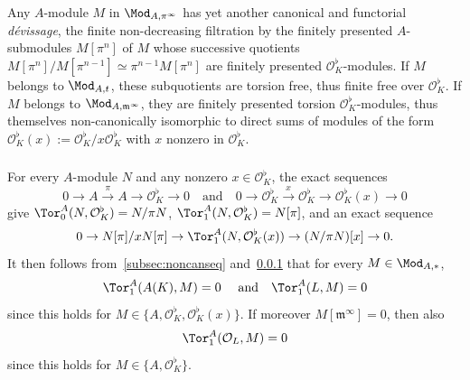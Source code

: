\subsubsection{}\label{subsec:FiltOnModAt=000026ModAm}

Any $A$-module $M$ in $\Mod_{A,\pi^{\infty}}$ has yet another canonical and functorial \emph{d\'evissage}, the finite non-decreasing filtration by the finitely presented $A$-submodules $M[\pi^{n}]$ of $M$ whose successive quotients $M[\pi^{n}]/M[\pi^{n-1}]\simeq\pi^{n-1}M[\pi^{n}]$ are finitely presented $\mathcal{O}_{K}^{\flat}$-modules. If $M$ belongs to $\Mod_{A,t}$, these subquotients are torsion free, thus finite free over $\mathcal{O}_{K}^{\flat}$. If $M$ belongs to $\Mod_{A,\mathfrak{m}^{\infty}}$, they are finitely presented torsion $\mathcal{O}_{K}^{\flat}$-modules, thus themselves non-canonically isomorphic to direct sums of modules of the form $\mathcal{O}_{K}^{\flat}(x):=\mathcal{O}_{K}^{\flat}/x\mathcal{O}_{K}^{\flat}$ with $x$ nonzero in $\mathcal{O}_{K}^{\flat}$.

\subsubsection{}\label{subsec:Tor(A(K)LO_L)}


For every $A$-module $N$ and any nonzero $x\in\mathcal{O}_{K}^{\flat}$, the exact sequences
\[
0\rightarrow A\stackrel{\pi}{\rightarrow}A\rightarrow\mathcal{O}_{K}^{\flat}\rightarrow0\quad\text{and}\quad0\rightarrow\mathcal{O}_{K}^{\flat}\stackrel{x}{\rightarrow}\mathcal{O}_{K}^{\flat}\rightarrow\mathcal{O}_{K}^{\flat}(x)\rightarrow0
\]
give $\Tor_{0}^{A}(N,\mathcal{O}_{K}^{\flat})=N/\pi N$, $\Tor_{1}^{A}(N,\mathcal{O}_{K}^{\flat})=N[\pi]$, and an exact sequence
\[
0\rightarrow N[\pi]/xN[\pi]\rightarrow\Tor_{1}^{A}(N,\mathcal{O}_{K}^{\flat}(x))\rightarrow(N/\pi N)[x]\rightarrow0.
\]
It then follows from~\ref{subsec:noncanseq} and~\ref{subsec:FiltOnModAt=000026ModAm} that for every $M\in\Mod_{A,\ast}$,
\[
\Tor_{1}^{A}(A(K),M)=0\quad\text{ and}\quad\Tor_{1}^{A}(L,M)=0
\]
since this holds for $M\in\{A,\mathcal{O}_{K}^{\flat},\mathcal{O}_{K}^{\flat}(x)\}$. If moreover $M[\mathfrak{m}^{\infty}]=0$, then also
\[
\Tor_{1}^{A}(\mathcal{O}_{L},M)=0
\]
since this holds for $M\in\{A,\mathcal{O}_{K}^{\flat}\}$.

\subsubsection{}

